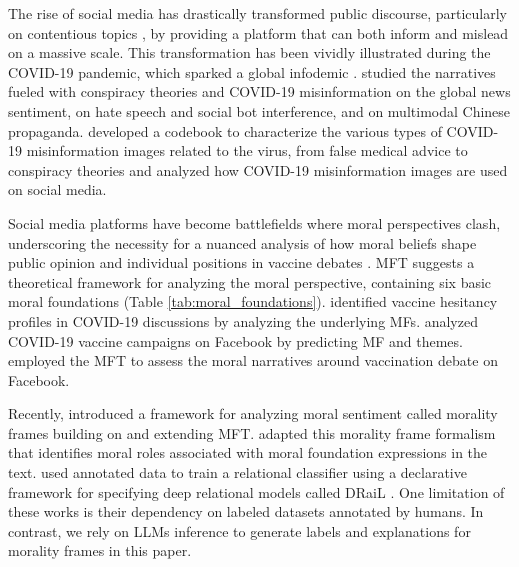 The rise of social media has drastically transformed public discourse, particularly on contentious topics \cite{barbera2024distract,islam2024post,islam2023weakly,islam2023analysis,islam2022understanding,puri2020social,mundt2018scaling,sharma2017analyzing,smith2013role}, by providing a platform that can both inform \cite{brynielsson2018informing,bhanot2012use,chou2009social} and mislead \cite{rocha2021impact,treen2020online,wu2019misinformation,moravec2018fake} on a massive scale. This transformation has been vividly illustrated during the COVID-19 pandemic, which sparked a global infodemic \cite{tagliabue2020pandemic}. \citet{ferrara2020characterizing} studied the narratives fueled with conspiracy theories and COVID-19 misinformation on the global news sentiment, on hate speech and social bot interference, and on multimodal Chinese propaganda. \citet{wang2023understanding} developed a codebook to characterize the various types of COVID-19 misinformation images related to the virus, from false medical advice to conspiracy theories and analyzed how COVID-19 misinformation images are used on social media.

Social media platforms have become battlefields where moral perspectives clash, underscoring the necessity for a nuanced analysis of how moral beliefs shape public opinion and individual positions in vaccine debates \cite{beiro2023moral, weinzierl2022hesitancy, islam2022understanding, rossen2019accepters, amin2017association}. MFT \cite{haidt2007morality,haidt2004intuitive} suggests a theoretical framework for analyzing the moral perspective, containing six basic moral foundations (Table \ref{tab:moral_foundations}). \citet{weinzierl2022hesitancy} identified vaccine hesitancy profiles in COVID-19 discussions by analyzing the  underlying MFs. \citet{islam2022understanding} analyzed COVID-19 vaccine campaigns on Facebook by predicting MF and themes. \citet{beiro2023moral} employed the MFT to assess the moral narratives around vaccination debate on Facebook.
%

Recently, \citet{roy2021identifying} introduced a framework for analyzing moral sentiment called morality frames building on and extending MFT. \citet{pacheco2022holistic} adapted this morality frame formalism that identifies moral roles associated with moral foundation expressions in the text. 
\citet{pacheco2022holistic,roy2021identifying} used annotated data to train a relational classifier using a declarative framework for specifying deep relational models called DRaiL \cite{pacheco-goldwasser-2021-modeling}. One limitation of these works is their dependency on labeled datasets annotated by humans. 
In contrast, we rely on LLMs inference to generate labels and explanations for morality frames in this paper.

